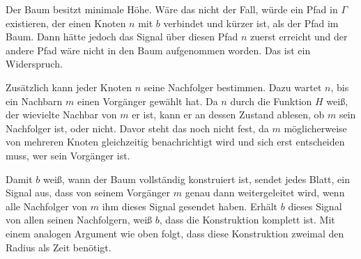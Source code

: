 \documentclass[11pt]{article}
\begin{document}
Der Baum besitzt minimale Höhe. 
Wäre das nicht der Fall, würde ein Pfad in $\Gamma$ existieren, der einen Knoten $n$ mit $b$ verbindet und kürzer ist, als der Pfad im Baum. 
Dann hätte jedoch das Signal über diesen Pfad $n$ zuerst erreicht und der andere Pfad wäre nicht in den Baum aufgenommen worden. 
Das ist ein Widerspruch.

Zusätzlich kann jeder Knoten $n$ seine Nachfolger bestimmen. 
Dazu wartet $n$, bis ein Nachbarn $m$ einen Vorgänger gewählt hat.
Da $n$ durch die Funktion $H$ weiß, der wievielte Nachbar von $m$ er ist, kann er an dessen Zustand ablesen, ob $m$ sein Nachfolger ist, oder nicht. 
Davor steht das noch nicht fest, da $m$ möglicherweise von mehreren Knoten gleichzeitig benachrichtigt wird und sich erst entscheiden muss, wer sein Vorgänger ist.

Damit $b$ weiß, wann der Baum vollständig konstruiert ist, sendet jedes Blatt, ein Signal aus, dass von seinem Vorgänger $m$ genau dann weitergeleitet wird, wenn alle Nachfolger von $m$ ihm dieses Signal gesendet haben. 
Erhält $b$ dieses Signal von allen seinen Nachfolgern, weiß $b$, dass die Konstruktion komplett ist.
Mit einem analogen Argument wie oben folgt, dass diese Konstruktion zweimal den Radius als Zeit benötigt.
\end{document}
